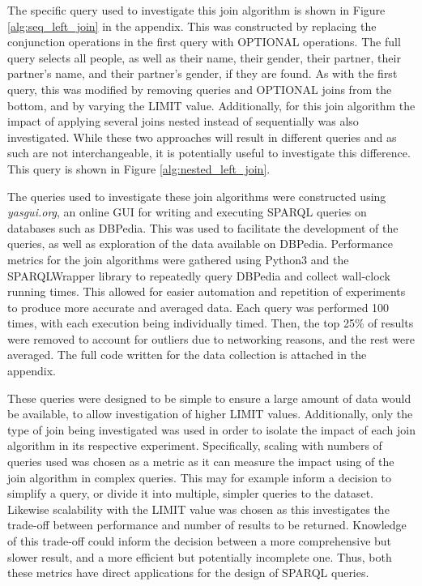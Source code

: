 \documentclass[10pt,a4paper]{article}
\begin{document}
	The specific query used to investigate this join algorithm is shown in Figure \ref{alg:seq_left_join} in the appendix. This was constructed by replacing the conjunction operations in the first query with OPTIONAL operations. The full query selects all people, as well as their name, their gender, their partner, their partner's name, and their partner's gender, if they are found. As with the first query, this was modified by removing queries and OPTIONAL joins from the bottom, and by varying the LIMIT value. Additionally, for this join algorithm the impact of applying several joins nested instead of sequentially was also investigated. While these two approaches will result in different queries and as such are not interchangeable, it is potentially useful to investigate this difference. This query is shown in Figure \ref{alg:nested_left_join}.
	
	The queries used to investigate these join algorithms were constructed using \emph{yasgui.org}, an online GUI for writing and executing SPARQL queries on databases such as DBPedia. This was used to facilitate the development of the queries, as well as exploration of the data available on DBPedia. Performance metrics for the join algorithms were gathered using Python3 and the SPARQLWrapper library to repeatedly query DBPedia and collect wall-clock running times. This allowed for easier automation and repetition of experiments to produce more accurate and averaged data. Each query was performed 100 times, with each execution being individually timed. Then, the top 25\% of results were removed to account for outliers due to networking reasons, and the rest were averaged. The full code written for the data collection is attached in the appendix.
	
	These queries were designed to be simple to ensure a large amount of data would be available, to allow investigation of higher LIMIT values. Additionally, only the type of join being investigated was used in order to isolate the impact of each join algorithm in its respective experiment. Specifically, scaling with numbers of queries used was chosen as a metric as it can measure the impact using of the join algorithm in complex queries. This may for example inform a decision to simplify a query, or divide it into multiple, simpler queries to the dataset. Likewise scalability with the LIMIT value was chosen as this investigates the trade-off between performance and number of results to be returned. Knowledge of this trade-off could inform the decision between a more comprehensive but slower result, and a more efficient but potentially incomplete one. Thus, both these metrics have direct applications for the design of SPARQL queries.
	
\end{document}
